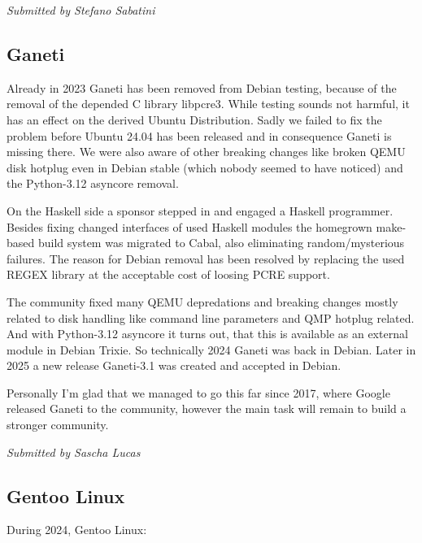 \documentclass[a4paper]{report}
\begin{document}
{\em Submitted by Stefano Sabatini}

\subsection{Ganeti}

Already in 2023 Ganeti has been removed from Debian testing, because of the removal of the depended C library libpcre3. While testing sounds not harmful, it has an effect on the derived Ubuntu Distribution. Sadly we failed to fix the problem before Ubuntu 24.04 has been released and in consequence Ganeti is missing there. We were also aware of other breaking changes like broken QEMU disk hotplug even in Debian stable (which nobody seemed to have noticed) and the Python-3.12 asyncore removal.

On the Haskell side a sponsor stepped in and engaged a Haskell programmer. Besides fixing changed interfaces of used Haskell modules the homegrown make-based build system was migrated to Cabal, also eliminating random/mysterious failures. The reason for Debian removal has been resolved by replacing the used REGEX library at the acceptable cost of loosing PCRE support.

The community fixed many QEMU depredations and breaking changes mostly related to disk handling like command line parameters and QMP hotplug related. And with Python-3.12 asyncore it turns out, that this is available as an external module in Debian Trixie. So technically 2024 Ganeti was back in Debian. Later in 2025 a new release Ganeti-3.1 was created and accepted in Debian.

Personally I'm glad that we managed to go this far since 2017, where Google released Ganeti to the community, however the main task will remain to build a stronger community.

{\em Submitted by Sascha Lucas}

\subsection{Gentoo Linux}

During 2024, Gentoo Linux:
\end{document}

